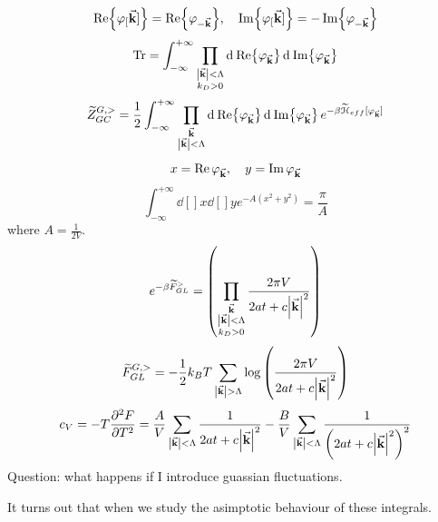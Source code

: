 \documentclass[../main/main.tex]{subfiles}
\begin{document}
\begin{equation}
  \Re {\varphi _[\va{k}]} = \Re {\varphi _{-\va{k}}}, \quad   \Im{\varphi _[\va{k}]} = -\Im {\varphi _{-\va{k}}}
\end{equation}
\begin{equation}
  \Tr = \int_{- \infty }^{+ \infty } \prod_{\substack{ \abs{\va{k}} < \Lambda   \\ k_D > 0 } }^{}   \dd[]{\Re {\varphi _{\va{k}}}}  \dd[]{\Im {\varphi _{\va{k}}}}
\end{equation}
\begin{equation}
  \widetilde{Z}_{GC}^{G,>} = \frac{1}{2} \int_{- \infty }^{+ \infty } \prod_{\substack{ \va{k}   \\\abs{\va{k}} < \Lambda } }^{} \dd[]{\Re {\varphi _{\va{k}}}}  \dd[]{\Im {\varphi _{\va{k}}}}
  e^{- \beta \widetilde{\mathcal{H}}_{eff} [\varphi _{\va{k}}] }
\end{equation}
\begin{equation}
  x = \Re \varphi _{\va{k}}, \quad   y = \Im \varphi _{\va{k}}
\end{equation}
\begin{equation}
  \int_{-\infty }^{+\infty } \dd[]{x} \dd[]{y} e^{-A (x^2+y^2)} = \frac{\pi }{A}
\end{equation}
where \( A= \frac{1}{2V} \).
\begin{equation}
  e^{-\beta \widetilde{F}_{GL}^> } = \qty(\prod_{\substack{\va{k} \\ \abs{\va{k}} <\Lambda \\ k_D > 0  } }^{}  \frac{2 \pi V}{2 a t + c \abs{\va{k}}^2 } )
\end{equation}
\begin{equation}
  \widetilde{F}_{GL}^{G,>} = - \frac{1}{2} k_B T \sum_{\abs{\va{k}}> \Lambda  }^{}
  \log{\qty(\frac{2 \pi V}{2 a t + c \abs{\va{k}}^2 })}
\end{equation}
\begin{equation}
  c_V = - T \pdv[2]{F}{T} = \frac{A}{V} \sum_{\abs{\va{k}} < \Lambda  }^{}
  \frac{1}{2 a t + c \abs{\va{k}}^2 } - \frac{B}{V} \sum_{\abs{\va{k}}< \Lambda  }^{} \frac{1}{\qty(2 a t + c \abs{\va{k}}^2)^2 }
\end{equation}
Question: what happens if I introduce guassian fluctuations.

It turns out that when we study the asimptotic behaviour of these integrals.
\end{document}
